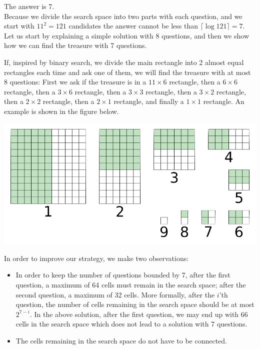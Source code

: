 \begin{solution}
The answer is 7.\\[0.2cm]

Because we divide the search space into two parts with each question, and we start with $11^2 = 121$ candidates the answer cannot be less than $\lceil \log 121\rceil=7$. Let us start by explaining a simple solution with 8 questions, and then we show how we can find the treasure with 7 questions.

If, inspired by binary search, we divide the main rectangle into 2 almost equal rectangles each time and ask one of them, we will find the treasure with at most 8 questions: First we ask if the treasure is in a  $11\times 6$ rectangle, then a $6\times 6$ rectangle, then a $3 \times 6$ rectangle, then a $3 \times 3$ rectangle, then a $3 \times 2$ rectangle, then a $2 \times 2$ rectangle, then a $2 \times 1$ rectangle, and finally a $1 \times 1$ rectangle. An example is shown in the figure below.

\begin{center}
	\includegraphics[width=14cm]{28/figs/28_diagram0.png}
\end{center}

In order to improve our strategy, we make two observations:
\begin{itemize}
\item In order to keep the number of questions bounded by 7, after the first question, a maximum of 64 cells must remain in the search space; after the second question, a maximum of 32 cells. More formally, after the $i$'th question, the number of cells remaining in the search space should be at most $2^{7-i}$. In the above solution, after the first question, we may end up with 66 cells in the search space which does not lead to a solution with 7 questions.
\item The cells remaining in the search space do not have to be connected.
\end{itemize}


\end{solution}
